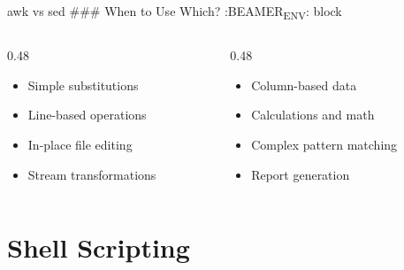 \documentclass[presentation,aspectratio=1610]{beamer}
\begin{document}
\begin{frame}[label={sec:org250ed50}]{awk vs sed}
\#\#\# When to Use Which?
:BEAMER\textsubscript{ENV}: block
\begin{columns}
\begin{column}{0.48\columnwidth}
\begin{exampleblock}{}\label{sec:orgc9fefad}
\begin{itemize}
\item Simple substitutions
\item Line-based operations
\item In-place file editing
\item Stream transformations
\end{itemize}
\end{exampleblock}
\end{column}
\begin{column}{0.48\columnwidth}
\begin{exampleblock}{}\label{sec:org3b8f861}
\begin{itemize}
\item Column-based data
\item Calculations and math
\item Complex pattern matching
\item Report generation
\end{itemize}
\end{exampleblock}
\end{column}
\end{columns}
\end{frame}
\section*{Shell Scripting}
\label{sec:orgc64f4bb}
\end{document}
